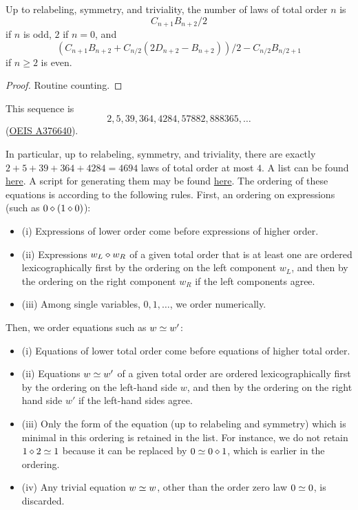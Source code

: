 \begin{lemma}\label{law-count-triv}
  Up to relabeling, symmetry, and triviality, the number of laws of total order $n$ is
  $$ C_{n+1} B_{n+2}/2$$
  if $n$ is odd, $2$ if $n = 0$, and
  $$ (C_{n+1} B_{n+2} + C_{n/2} (2D_{n+2} - B_{n+2}))/2 - C_{n/2} B_{n/2+1}$$
  if $n \geq 2$ is even.
\end{lemma}

\begin{proof}
  Routine counting.
\end{proof}

This sequence is
$$2, 5, 39, 364, 4284, 57882, 888365, \dots$$
(\href{https://oeis.org/A376640}{OEIS A376640}).

In particular, up to relabeling, symmetry, and triviality, there are exactly $2+5+39+364+4284=4694$ laws of total order at most $4$. A list can be found \href{https://github.com/teorth/equational_theories/blob/main/data/equations.txt}{here}. A script for generating them may be found \href{https://github.com/teorth/equational_theories/blob/main/scripts/generate_eqs_list.py}{here}. The ordering of these equations is according to the following rules.  First, an ordering on expressions (such as $0 \diamond (1 \diamond 0)$):
\begin{itemize}
\item (i)  Expressions of lower order come before expressions of higher order.
\item (ii) Expressions $w_L \diamond w_R$ of a given total order that is at least one are ordered lexicographically first by the ordering on the left component $w_L$, and then by the ordering on the right component $w_R$ if the left components agree.
\item (iii) Among single variables, $0, 1, \dots$, we order numerically.
\end{itemize}
Then, we order equations such as $w \simeq w'$:
\begin{itemize}
\item (i)  Equations of lower total order come before equations of higher total order.
\item (ii) Equations $w \simeq w'$ of a given total order are ordered lexicographically first by the ordering on the left-hand side $w$, and then by the ordering on the right hand side $w'$ if the left-hand sides agree.
\item (iii) Only the form of the equation (up to relabeling and symmetry) which is minimal in this ordering is retained in the list.  For instance, we do not retain $1 \diamond 2 \simeq 1$ because it can be replaced by $0 \simeq 0 \diamond 1$, which is earlier in the ordering.
\item (iv) Any trivial equation $w \simeq w$, other than the order zero law $0 \simeq 0$, is discarded.
\end{itemize}
